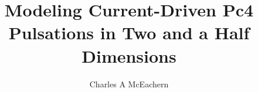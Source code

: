 

\phd %

%
\title{\bf Modeling Current-Driven Pc4 Pulsations in Two and a Half Dimensions}
\author{Charles A McEachern}


\abstract{}
\copyrightpage %
\acknowledgements{}
\dedication{}


\beforepreface

\figurespage
\tablespage

\afterpreface

